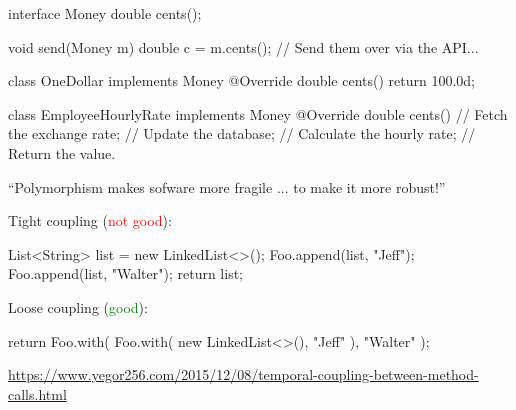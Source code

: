 \documentclass{article}
\begin{document}
\begin{multicols}{2}
{\scriptsize\begin{ffcode}
interface Money {
  double cents();
}

void send(Money m) {
  double c = m.cents();
  // Send them over via the API...
}

class OneDollar implements Money {
  @Override
  double cents() {
    return 100.0d;
  }
}
\end{ffcode}
}
\par\columnbreak\par
{\scriptsize\begin{ffcode}
class EmployeeHourlyRate
  implements Money {
  @Override
  double cents() {
    // Fetch the exchange rate;
    // Update the database;
    // Calculate the hourly rate;
    // Return the value.
  }
}
\end{ffcode}
}
\par
``Polymorphism makes sofware more fragile ... to make it more robust!''
\end{multicols}
\plush{}

\begin{multicols}{2}
Tight coupling (\textcolor{red}{not good}):\par
{\small\begin{ffcode}
List<String> list =
  new LinkedList<>();
Foo.append(list, "Jeff");
Foo.append(list, "Walter");
return list;
\end{ffcode}
}
\par\columnbreak\par
Loose coupling (\textcolor{green}{good}):\par
{\small\begin{ffcode}
return Foo.with(
  Foo.with(
    new LinkedList<>(),
    "Jeff"
  ),
  "Walter"
);
\end{ffcode}
}
\end{multicols}\par
{\scriptsize \url{https://www.yegor256.com/2015/12/08/temporal-coupling-between-method-calls.html}\par}
\plush{}
\end{document}
